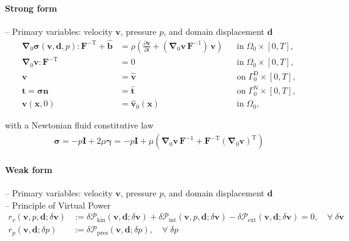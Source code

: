 \documentclass[a4paper,12pt]{report}
\newcommand{\bs}[1]{\boldsymbol{#1}}
\newcommand{\Om}{\mathit{\Omega}}
\newcommand{\Gm}{\mathit{\Gamma}}
\begin{document}
\paragraph{Strong form}
-- Primary variables: velocity $\bs{v}$, pressure $p$, and domain displacement $\bs{d}$
\begin{align}
\bs{\nabla}_{0} \bs{\sigma}(\bs{v},\bs{d},p) : \bs{F}^{-\mathrm{T}} + \hat{\bs{b}} &= \rho\left(\frac{\partial\bs{v}}{\partial t} + (\bs{\nabla}_0\bs{v}\,\bs{F}^{-1})\,\bs{v}\right) &&\text{in} \; \mathit{\Om}_0 \times [0, T], \label{eq:divsigma_ns_ale} \\
\bs{\nabla}_{0}\bs{v} : \bs{F}^{-\mathrm{T}} &= 0 &&\text{in} \; \mathit{\Om}_0 \times [0, T],\label{eq:divv_ns_ale}\\
\bs{v} &= \hat{\bs{v}} &&\text{on} \; \mathit{\Gm}_0^{\mathrm{D}} \times [0, T], \label{eq:bc_v_ns_ale}\\
\bs{t} = \bs{\sigma}\bs{n} &= \hat{\bs{t}} &&\text{on} \; \mathit{\Gm}_0^{\mathrm{N}} \times [0, T], \label{eq:bc_N_ns_ale}\\
\bs{v}(\bs{x},0) &= \hat{\bs{v}}_{0}(\bs{x}) &&\text{in} \; \mathit{\Om}_0, \label{eq:ini_v_ns_ale}
\end{align}

with a Newtonian fluid constitutive law
\begin{align}
\bs{\sigma} = -p \bs{I} + 2 \mu \bs{\gamma} = -p \bs{I} + \mu \left(\bs{\nabla}_0 \bs{v}\,\bs{F}^{-1} + \bs{F}^{-\mathrm{T}}(\bs{\nabla}_0 \bs{v})^{\mathrm{T}}\right)
\end{align}

\paragraph{Weak form}

-- Primary variables: velocity $\bs{v}$, pressure $p$, and domain displacement $\bs{d}$\\

-- Principle of Virtual Power
\begin{align}
r_v(\bs{v},p,\bs{d};\delta\bs{v}) &:= \delta \mathcal{P}_{\mathrm{kin}}(\bs{v},\bs{d};\delta\bs{v}) + \delta \mathcal{P}_{\mathrm{int}}(\bs{v},p,\bs{d};\delta\bs{v}) - \delta \mathcal{P}_{\mathrm{ext}}(\bs{v},\bs{d};\delta\bs{v}) = 0, \quad \forall \; \delta\bs{v} \label{eq:res_v_fluid_ale}\\
r_p(\bs{v},\bs{d};\delta p) &:= \delta \mathcal{P}_{\mathrm{pres}}(\bs{v},\bs{d};\delta p), \quad \forall \; \delta p \label{eq:res_p_fluid_ale}
\end{align}
\end{document}
